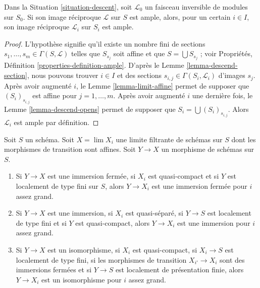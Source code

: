 \begin{lemma}
\label{lemma-limit-ample}
Dans la Situation \ref{situation-descent}, soit $\mathcal{L}_0$ un faisceau
inversible de modules sur $S_0$. Si son image réciproque $\mathcal{L}$ sur
$S$ est ample, alors, pour un certain $i \in I$, son image réciproque
$\mathcal{L}_i$ sur $S_i$ est ample.
\end{lemma}

\begin{proof}
L'hypothèse signifie qu'il existe un nombre fini de sections
$s_1, \ldots, s_m \in \Gamma(S, \mathcal{L})$ telles que $S_{s_j}$ soit
affine et que $S = \bigcup S_{s_j}$ ; voir Propriétés,
Définition \ref{properties-definition-ample}. D'après le
Lemme \ref{lemma-descend-section}, nous pouvons trouver $i \in I$ et des
sections $s_{i, j} \in \Gamma(S_i, \mathcal{L}_i)$ d'images $s_j$.
Après avoir augmenté $i$, le Lemme \ref{lemma-limit-affine} permet de
supposer que $(S_i)_{s_{i, j}}$ est affine pour $j = 1, \ldots, m$.
Après avoir augmenté $i$ une dernière fois, le
Lemme \ref{lemma-descend-opens} permet de supposer que
$S_i = \bigcup (S_i)_{s_{i, j}}$. Alors $\mathcal{L}_i$ est ample par
définition.
\end{proof}

\begin{lemma}
\label{lemma-finite-type-eventually-closed}
Soit $S$ un schéma. Soit $X = \lim X_i$ une limite filtrante de schémas sur
$S$ dont les morphismes de transition sont affines. Soit $Y \to X$ un
morphisme de schémas sur $S$.
\begin{enumerate}
\item Si $Y \to X$ est une immersion fermée, si $X_i$ est quasi-compact et
si $Y$ est localement de type fini sur $S$, alors $Y \to X_i$ est une
immersion fermée pour $i$ assez grand.
\item Si $Y \to X$ est une immersion, si $X_i$ est quasi-séparé, si
$Y \to S$ est localement de type fini et si $Y$ est quasi-compact, alors
$Y \to X_i$ est une immersion pour $i$ assez grand.
\item Si $Y \to X$ est un isomorphisme, si $X_i$ est quasi-compact, si
$X_i \to S$ est localement de type fini, si les morphismes de transition
$X_{i'} \to X_i$ sont des immersions fermées et si $Y \to S$ est localement
de présentation finie, alors $Y \to X_i$ est un isomorphisme pour $i$ assez
grand.
\end{enumerate}
\end{lemma}

